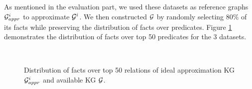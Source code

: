 As mentioned in the evaluation part, we used these datasets as reference graphs $\mathcal{G}^i_{appr}$ to approximate $\mathcal{G}^i$. We then constructed $\mathcal{G}$ by randomly selecting $80\%$ of its facts while preserving the distribution of facts over predicates. Figure \ref{table:pred_distribution} demonstrates the distribution of facts over top 50 predicates for the 3 datasets.
 \begin{figure}[t]
     \centering
     \\
     \caption{Distribution of facts over top 50 relations of ideal approximation KG $\mathcal{G}^i_{appr}$ and available KG $\mathcal{G}$.}
     \label{table:pred_distribution}
\end{figure}

